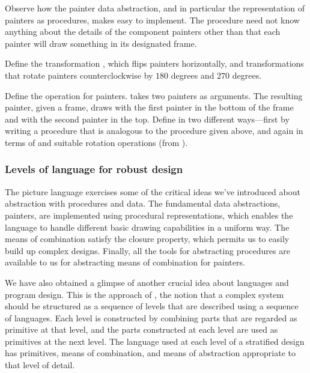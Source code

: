 Observe how the painter data abstraction, and in particular the representation of painters as procedures, makes  easy to implement.
The  procedure need not know anything about the details of the component painters other than that each painter will draw something in its designated frame.

\begin{exercise}
\label{Exercise 2.50}
Define the transformation , which flips painters horizontally, and transformations that rotate painters counterclockwise by \( 180 \) degrees and \( 270 \) degrees.
\end{exercise}



\begin{exercise}
\label{Exercise 2.51}
Define the  operation for painters.
 takes two painters as arguments.
The resulting painter, given a frame, draws with the first painter in the bottom of the frame and with the second painter in the top.
Define  in two different ways---first by writing a procedure that is analogous to the  procedure given above, and again in terms of  and suitable rotation operations (from ).
\end{exercise}



\subsubsection*{Levels of language for robust design}

The picture language exercises some of the critical ideas we’ve introduced about abstraction with procedures and data.
The fundamental data abstractions, painters, are implemented using procedural representations, which enables the language to handle different basic drawing capabilities in a uniform way.
The means of combination satisfy the closure property, which permits us to easily build up complex designs.
Finally, all the tools for abstracting procedures are available to us for abstracting means of combination for painters.

We have also obtained a glimpse of another crucial idea about languages and program design.
This is the approach of , the notion that a complex system should be structured as a sequence of levels that are described using a sequence of languages.
Each level is constructed by combining parts that are regarded as primitive at that level, and the parts constructed at each level are used as primitives at the next level.
The language used at each level of a stratified design has primitives, means of combination, and means of abstraction appropriate to that level of detail.

